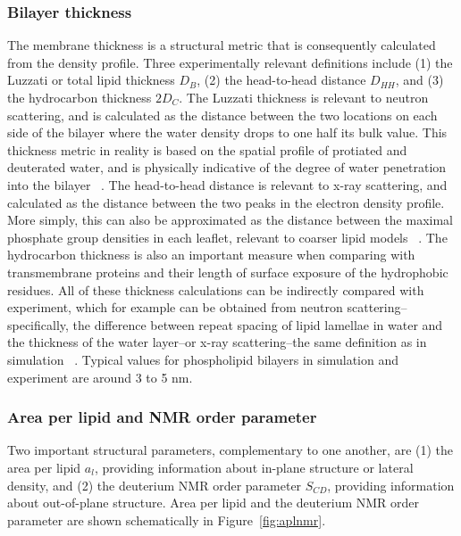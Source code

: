 \documentclass[9pt,bestpractices,pubversion]{livecoms}
\begin{document}
\subsubsection{Bilayer thickness}
\label{subsubsec:thickness}
The membrane thickness is a structural metric that is consequently calculated from the density profile.
Three experimentally relevant definitions include (1) the Luzzati or total lipid thickness $D_B$, (2) the head-to-head distance $D_{HH}$, and (3) the hydrocarbon thickness $2D_C$.
The Luzzati thickness is relevant to neutron scattering, and is calculated as the distance between the two locations on each side of the bilayer where the water density drops to one half its bulk value.
This thickness metric in reality is based on the spatial profile of protiated and deuterated water, and is physically indicative of the degree of water penetration into the bilayer ~\cite{Poger2016}.
The head-to-head distance is relevant to x-ray scattering, and calculated as the distance between the two peaks in the electron density profile.
More simply, this can also be approximated as the distance between the maximal phosphate group densities in each leaflet, relevant to coarser lipid models ~\cite{Poger2016}.
The hydrocarbon thickness is also an important measure when comparing with transmembrane proteins and their length of surface exposure of the hydrophobic residues.
All of these thickness calculations can be indirectly compared with experiment, which for example can be obtained from neutron scattering--specifically, the difference between repeat spacing of lipid lamellae in water and the thickness of the water layer--or x-ray scattering--the same definition as in simulation ~\cite{Poger2016}.
Typical values for phospholipid bilayers in simulation and experiment are around 3 to 5 nm.

\subsubsection{Area per lipid and NMR order parameter}
\label{subsubsec:aplnmr}
Two important structural parameters, complementary to one another, are (1) the area per lipid $a_l$, providing information about in-plane structure or lateral density, and (2) the deuterium NMR order parameter $S_{CD}$, providing information about out-of-plane structure.
Area per lipid and the deuterium NMR order parameter are shown schematically in Figure~\ref{fig:aplnmr}.
\end{document}
